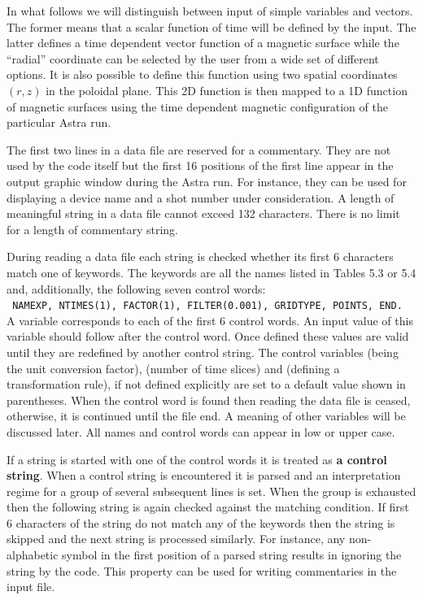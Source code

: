 In what follows we will distinguish between input of simple variables 
and vectors. 
The former means that a scalar function of time will be defined by the
input. 
The latter defines a time dependent vector function of a magnetic
surface while the ``radial'' coordinate can be selected by the user from a
wide set of different options. 
It is also possible to define this function using two spatial
coordinates $(r,z)$ in the poloidal plane.  
This 2D function is then mapped to a 1D function of magnetic surfaces 
using the time dependent magnetic configuration of the particular Astra
run. 

The first two lines in a data file are reserved for a commentary. 
They are not used by the code itself but the first 16 positions of 
the first line appear in the output graphic window during the Astra run.
For instance, they can be used for displaying a device name and a shot 
number under consideration.
A length of meaningful string in a data file cannot exceed 132
characters. 
There is no limit for a length of commentary string.

During reading a data file each string is checked whether its first 6
characters match one of keywords. 
The keywords are all the names listed in Tables 5.3 or 5.4
and, additionally, the following seven control words: 
\\ 
{\tt\indent
NAMEXP, NTIMES(1), FACTOR(1), FILTER(0.001), GRIDTYPE, POINTS, END.
}\\
A variable corresponds to each of the first 6 control words.
An input value of this variable should follow after the control word.
Once defined these values are valid until they are redefined by 
another control string.
The control variables  (being the unit conversion factor),
 (number of time slices) and  (defining a
transformation rule), if not defined explicitly are set to a default
value shown in parentheses. 
When the control word  is found then reading the data file 
is ceased, otherwise, it is continued until the file end.
A meaning of other variables will be discussed later.
All names and control words can appear in low or upper case.

If a string is started with one of the control words it
is treated as {\bf a control string}.
When a control string is encountered it is parsed and an interpretation
regime for a group of several subsequent lines is set.
When the group is exhausted then the following 
string is again checked against the matching condition. 
If first 6 characters of the string do not match any of the keywords 
then the string is skipped and the next string is processed similarly. 
For instance, any non-alphabetic symbol in the first position of 
a parsed string results in ignoring the string by the code.
This property can be used for writing commentaries in the input file.

